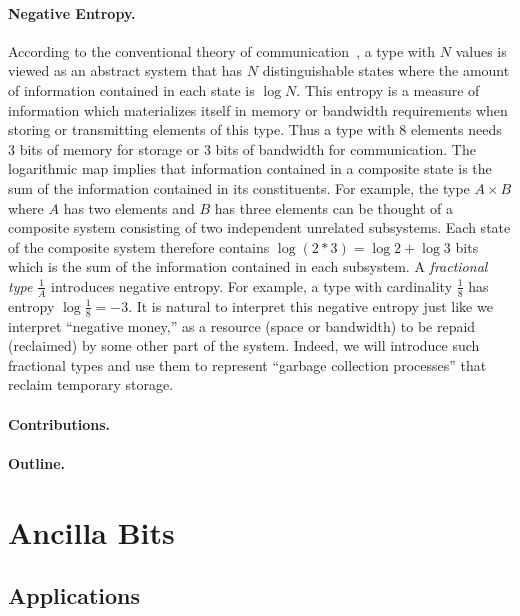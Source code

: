 \documentclass[sigplan,10pt,review,anonymous]{acmart}
\begin{document}
\paragraph*{Negative Entropy.}  
According to the conventional theory of
communication~\cite{Shannon1948}, a type with $N$ values is viewed as
an abstract system that has $N$ distinguishable states where the
amount of information contained in each state is $\log{N}$. This
entropy is a measure of information which materializes itself in
memory or bandwidth requirements when storing or transmitting elements
of this type. Thus a type with 8 elements needs 3 bits of memory for
storage or 3 bits of bandwidth for communication. The logarithmic map
implies that information contained in a composite state is the sum of
the information contained in its constituents. For example, the type
$A \times B$ where $A$ has two elements and $B$ has three elements can
be thought of a composite system consisting of two independent
unrelated subsystems.  Each state of the composite system therefore
contains $\log{(2*3)} = \log{2} + \log{3}$ bits which is the sum of
the information contained in each subsystem. A \emph{fractional type}
$\frac{1}{A}$ introduces negative entropy. For example, a type with
cardinality $\frac{1}{8}$ has entropy $\log{\frac{1}{8}} = -3$. It is
natural to interpret this negative entropy just like we interpret
``negative money,'' as a resource (space or bandwidth) to be repaid
(reclaimed) by some other part of the system. Indeed, we will
introduce such fractional types and use them to represent ``garbage
collection processes'' that reclaim temporary storage.

\paragraph*{Contributions.} 

\paragraph*{Outline.}

\section{Ancilla Bits}
\label{sec:examples}
 
\subsection{Applications}
 
\end{document}
